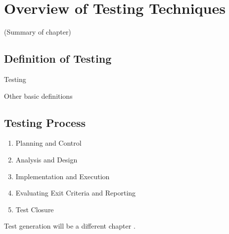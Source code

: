 \chapter{Overview of Testing Techniques}
\label{cha:overview-of-testing}

(Summary of chapter)

\section{Definition of Testing}
\label{sec:definition-of-testing}

Testing \cite{myers-1979}

Other basic definitions

\section{Testing Process}
\label{sec:testing-process}

\begin{enumerate}
    \item Planning and Control
    \item Analysis and Design
    \item Implementation and Execution
    \item Evaluating Exit Criteria and Reporting    
    \item Test Closure
\end{enumerate}

Test generation will be a different chapter \cite{Anand13}.